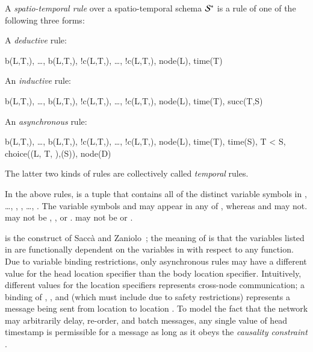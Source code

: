 A {\em spatio-temporal rule} over a spatio-temporal schema $\stschema$ is a rule of one of the following three forms:

A {\em deductive} rule:

\begin{Drules}
        {b(L,T,), \ldots, b(L,T,), !c(L,T,), \ldots, !c(L,T,), node(L), time(T)}
\end{Drules}

An {\em inductive} rule:

\begin{Drules}
        {b(L,T,), \ldots, b(L,T,), !c(L,T,), \ldots, !c(L,T,), node(L), time(T), succ(T,S)}
\end{Drules}

An {\em asynchronous} rule:

\begin{Drules}
        {b(L,T,), \ldots, b(L,T,),
          !c(L,T,), \ldots, !c(L,T,),
          node(L), time(T), time(S), T < S, choice((L, T, ),(S)), node(D)}
\end{Drules}

The latter two kinds of rules are collectively called {\em temporal} rules.

In the above rules,  is a tuple that contains all of the distinct variable symbols in  , \ldots, , , \ldots, .  The variable symbols  and  may appear in any of , whereas  and  may not.   may not be , , or .   may not be  or .

 is the construct of Sacc\`{a} and Zaniolo~\cite{sacca-zaniolo}; the meaning of  is that the variables listed in  are functionally dependent on the variables in  with respect to any function.  Due to variable binding restrictions, only asynchronous rules may have a different value for the head location specifier than the body location specifier.  Intuitively, different values for the location specifiers represents cross-node communication; a binding of , , and  (which must include  due to safety restrictions) represents a message being sent from location  to location .  To model the fact that the network may arbitrarily delay, re-order, and batch messages, any single value of head timestamp  is permissible for a message as long as it obeys the {\em causality constraint} .

